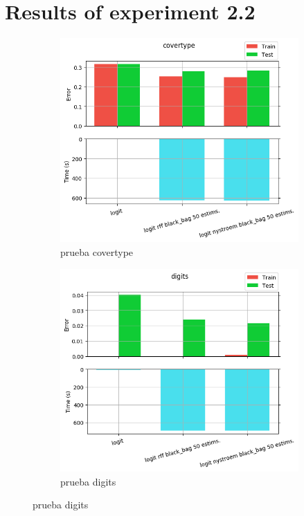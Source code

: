 
\chapter{Results of experiment 2.2} %

\label{Appendix2-2} %

\begin{figure}[ht]
  \centering
  \begin{subfigure}[b]{0.5\linewidth}
    \centering\includegraphics[width=\imgscale\linewidth]{Figures/2_2/covertype}
    \caption{prueba covertype}
    \label{fig:2_2_covertype}
  \end{subfigure}%
  \begin{subfigure}[b]{0.5\linewidth}
    \centering\includegraphics[width=\imgscale\linewidth]{Figures/2_2/digits}
    \caption{prueba digits}
    \label{fig:2_2_digits}
  \end{subfigure}
\end{figure}


